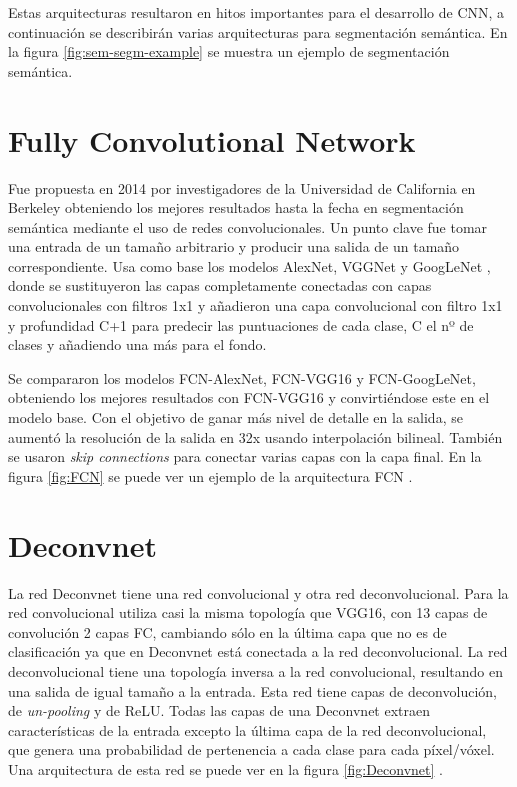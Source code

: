 Estas arquitecturas resultaron en hitos importantes para el desarrollo de CNN, a continuación se describirán varias arquitecturas para segmentación semántica. En la figura \ref{fig:sem-segm-example} \cite{Jeong2018} se muestra un ejemplo de segmentación semántica.


\newpage\section{Fully Convolutional Network}\label{sec:fcn}

Fue propuesta en 2014 por investigadores de la Universidad de California en Berkeley \cite{Long2014} obteniendo los mejores resultados hasta la fecha en segmentación semántica mediante el uso de redes convolucionales. Un punto clave fue tomar una entrada de un tamaño arbitrario y producir una salida de un tamaño correspondiente. Usa como base los modelos AlexNet, VGGNet y GoogLeNet \cite{Szegedy2014}, donde se sustituyeron las capas completamente conectadas con capas convolucionales con filtros 1x1 y añadieron una capa convolucional con filtro 1x1 y profundidad C+1 para predecir las puntuaciones de cada clase, C el nº de clases y añadiendo una más para el fondo.

Se compararon los modelos FCN-AlexNet, FCN-VGG16 y FCN-GoogLeNet, obteniendo los mejores resultados con FCN-VGG16 y convirtiéndose este en el modelo base. Con el objetivo de ganar más nivel de detalle en la salida, se aumentó la resolución de la salida en 32x usando interpolación bilineal. También se usaron \textit{skip connections} para conectar varias capas con la capa final. En la figura \ref{fig:FCN} se puede ver un ejemplo de la arquitectura FCN \cite{Sultana2020}.



\section{Deconvnet}\label{sec:deconvnet}

La red Deconvnet \cite{Noh2015} tiene una red convolucional y otra red deconvolucional. Para la red convolucional utiliza casi la misma topología que VGG16, con 13 capas de convolución 2 capas FC, cambiando sólo en la última capa que no es de clasificación ya que en Deconvnet está conectada a la red deconvolucional. La red deconvolucional tiene una topología inversa a la red convolucional, resultando en una salida de igual tamaño a la entrada. Esta red tiene capas de deconvolución, de \textit{un-pooling} y de ReLU. Todas las capas de una Deconvnet extraen características de la entrada excepto la última capa de la red deconvolucional, que genera una probabilidad de pertenencia a cada clase para cada píxel/vóxel. Una arquitectura de esta red se puede ver en la figura \ref{fig:Deconvnet} \cite{Noh2015}.

